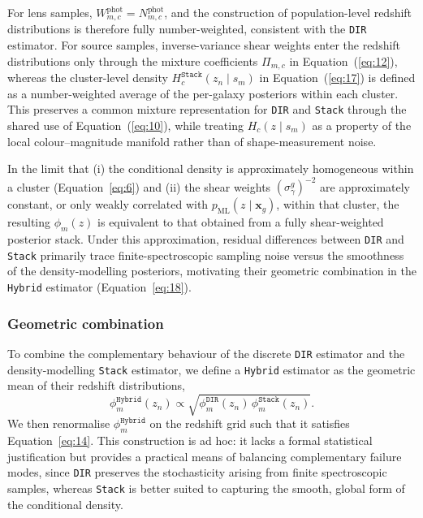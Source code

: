For lens samples, \(W_{m,c}^\mathrm{phot}=N_{m,c}^\mathrm{phot}\), and the construction of population-level redshift distributions is therefore fully number-weighted, consistent with the \texttt{DIR} estimator. For source samples, inverse-variance shear weights enter the redshift distributions only through the mixture coefficients \(\Pi_{m,c}\) in Equation~(\ref{eq:12}), whereas the cluster-level density \(H_c^\texttt{Stack}(z_n \mid s_m)\) in Equation~(\ref{eq:17}) is defined as a number-weighted average of the per-galaxy posteriors within each cluster. This preserves a common mixture representation for \texttt{DIR} and \texttt{Stack} through the shared use of Equation~(\ref{eq:10}), while treating \(H_c(z \mid s_m)\) as a property of the local colour--magnitude manifold rather than of shape-measurement noise.

In the limit that (i) the conditional density is approximately homogeneous within a cluster (Equation~\ref{eq:6}) and (ii) the shear weights \((\sigma_\gamma^g)^{-2}\) are approximately constant, or only weakly correlated with \(p_\mathrm{ML}(z \mid \mathbf{x}_g)\), within that cluster, the resulting \(\phi_m(z)\) is equivalent to that obtained from a fully shear-weighted posterior stack. Under this approximation, residual differences between \texttt{DIR} and \texttt{Stack} primarily trace finite-spectroscopic sampling noise versus the smoothness of the density-modelling posteriors, motivating their geometric combination in the \texttt{Hybrid} estimator (Equation~\ref{eq:18}).

\subsubsection{Geometric combination} \label{sec:2.2.3}

To combine the complementary behaviour of the discrete \texttt{DIR} estimator and the density-modelling \texttt{Stack} estimator, we define a \texttt{Hybrid} estimator as the geometric mean of their redshift distributions,
\begin{equation} \label{eq:18}
    \phi_m^\texttt{Hybrid}(z_n) \propto \sqrt{\phi_m^\texttt{DIR}(z_n) \, \phi_m^\texttt{Stack}(z_n)}.
\end{equation}
We then renormalise \(\phi_m^\texttt{Hybrid}\) on the redshift grid such that it satisfies Equation~\ref{eq:14}. This construction is ad hoc: it lacks a formal statistical justification but provides a practical means of balancing complementary failure modes, since \texttt{DIR} preserves the stochasticity arising from finite spectroscopic samples, whereas \texttt{Stack} is better suited to capturing the smooth, global form of the conditional density.

